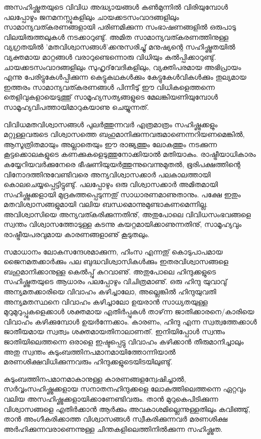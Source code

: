 ﻿

\vskip 2pt

അസഹിഷ്ണുതയുടെ വിവിധ അദ്ധ്യായങ്ങള്‍ കണ്‍മുന്നില്‍ വിരിയുമ്പോള്‍ പലപ്പോഴും ജനമനസ്സുകളിലും ചായക്കടസംവാദങ്ങളിലും 
സാമാന്യവത്കരണങ്ങളായി പരിണമിക്കുന്ന സംഭാഷണങ്ങളില്‍ ഒരുപാടു വിലയിരുത്തലുകള്‍ നടക്കാറുണ്ടു്. അമിത സാമാന്യവത്കരണത്തിനുള്ള
 വ്യഗ്രതയില്‍ 'മതവിശ്വാസങ്ങള്‍'ക്കനുസരിച്ചു് മനുഷ്യന്റെ സഹിഷ്ണുതയില്‍ വ്യക്തമായ മാറ്റങ്ങള്‍ വരാറുണ്ടെന്നൊരു വിധിയും കല്‍പ്പിക്കാറുണ്ടു്. 
 ചായക്കടസംവാദങ്ങളിലും സുഹൃദ്‌വേദികളിലും, വ്യക്തിപരമായ അഭിപ്രായം എന്നു പേരിട്ടുകേള്‍പ്പിക്കുന്ന കെട്ടുകഥകള്‍ക്കും കേട്ടുകേള്‍വികള്‍ക്കും
  തുല്യമായ ഇത്തരം സാമാന്യവത്കരണങ്ങള്‍ പിന്നീടു് ഈ വിധികളെത്തന്നെ തെളിവുകളായെടുത്തു് സാമൂഹ്യസത്യങ്ങളുടെ 
  മേലങ്കിയണിയുമ്പോള്‍ സാമൂഹ്യവിപത്തായിമാറുകയാണു ചെയ്യുന്നത്.

വിവിധമതവിശ്വാസങ്ങള്‍ പുലര്‍ത്തുന്നവര്‍ എത്രമാത്രം സഹിഷ്ണുക്കളും മറ്റുള്ളവരുടെ വിശ്വാസത്തെ ബഹുമാനിക്കുന്നവരുമാണെന്നറിയണമെങ്കില്‍, 
ആസൂത്രിതമായും അല്ലാതെയും ഈ രാജ്യത്തും ലോകത്തും നടക്കുന്ന കൂട്ടക്കൊലകളുടെ കണക്കുകളെടുത്തുനോക്കിയാല്‍ മതിയാകും. 
രാഷ്ട്രീയാധികാരം കയ്യേറിയവര്‍ക്കുനേരെ ഭീഷണിയുയര്‍ത്തുന്നുവെന്നുമുതല്‍, ഭൂരിപക്ഷത്തിന്റെ വിനോദത്തിനുവേണ്ടിവരെ അന്യവിശ്വാസക്കാര്‍ 
പലകാലത്തായി കൊലചെയ്യപ്പെട്ടിട്ടുണ്ടു്. പലപ്പോഴും ഒരു വിശ്വാസക്കാര്‍ അമിതമായി സഹിഷ്ണുക്കളായി മുദ്രകുത്തപ്പെടുന്നതു് സാധാരണമാണുതാനും. 
പക്ഷേ ഇതും മതവിശ്വാസങ്ങളുമായി വലിയ ബന്ധമൊന്നുമുണ്ടാകണമെന്നില്ല. അവിശ്വാസിയെ അന്യവത്കരിക്കുന്നതിനു്, അതുപോലെ 
വിവിധസംഭവങ്ങളെ സ്വന്തം വിശ്വാസത്തോടുള്ള കടന്നു കയറ്റമായിക്കാണുന്നതിനു്, സാമൂഹ്യവും രാഷ്ട്രീയപരവുമായ കാരണങ്ങളാണു് കൂടുതലും.

സമാധാനം ലോകസന്ദേശമാക്കുന്ന, ഹിംസ എന്നതു് കൊടുപാപമായ ജൈനമതക്കാര്‍ക്കും പല ബുദ്ധവിശ്വാസികള്‍ക്കും 
ഇതരവിശ്വാസങ്ങളെ ബഹുമാനിക്കാനുള്ള കെല്‍പ്പു് കുറവാണു്. അതുപോലെ ഹിന്ദുക്കളുടെ സഹിഷ്ണുതയുടെ ആധാരം പലപ്പോഴും 
വിചിത്രമാണു്. ഒരു ഹിന്ദു യുവാവു് അന്യമതക്കാരിയെ വിവാഹം കഴിച്ചാലോ, അല്ലെങ്കില്‍ ഹിന്ദുയുവതി അന്യമതസ്ഥനെ വിവാഹം 
കഴിച്ചാലോ ഉയരാന്‍ സാധ്യതയുള്ള മുറുമുറുപ്പുകളെക്കാള്‍ ശക്തമായ എതിര്‍പ്പുകള്‍ താഴ്‌ന്ന ജാതിക്കാരനെ/കാരിയെ വിവാഹം 
കഴിക്കുമ്പോള്‍ ഉയര്‍ന്നേക്കാം. കാരണം, ഹിന്ദു എന്ന സ്വത്വത്തേക്കാള്‍ ജാതീയമായ സ്വത്വം ശക്തമായതിനാലാണത്. 
ഇനിയിപ്പോള്‍ സ്വന്തം ജാതിയിലെത്തന്നെ ഒരാളെ ഇഷ്ടപ്പെട്ടു വിവാഹം കഴിക്കാന്‍ തീരുമാനിച്ചാലും അതു സ്വന്തം 
കുടുംബത്തിനപമാനമായിത്തോന്നിയാല്‍ മരണശിക്ഷവിധിക്കുന്നവരും ഹിന്ദുക്കളുടെയിടയിലുണ്ടു്.

കുടുംബത്തിനപമാനമാകാനുള്ള കാരണങ്ങളന്വേഷിച്ചാല്‍, സര്‍വ്വംസഹിഷ്ണുക്കളായ സനാതനഹിന്ദുക്കളെ ലോകത്തിലെത്തന്നെ
 ഏറ്റവും വലിയ അസഹിഷ്ണുക്കളായിക്കാണേണ്ടിവരും. താന്‍ മുറുകെപിടിക്കുന്ന വിശ്വാസങ്ങളെ എതിര്‍ക്കാന്‍ ആര്‍ക്കും അവകാശമില്ലെന്നുള്ളതിലും 
 കവിഞ്ഞു്, താന്‍ അംഗീകരിക്കാത്ത വിശ്വാസങ്ങള്‍ സ്വീകരിക്കുന്നവര്‍ മരണശിക്ഷ അര്‍ഹിക്കുന്നവരാണെന്നുള്ള 
 ചിന്തകളിലെത്തിനില്‍ക്കുന്ന സഹിഷ്ണുത.

